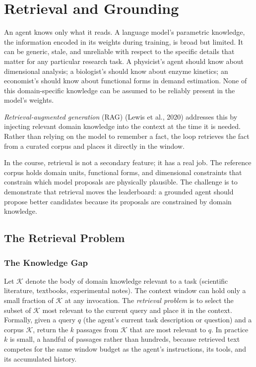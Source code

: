 \chapter{Retrieval and Grounding}
\label{chapter:Retrieval}

An agent knows only what it reads.
A language model's parametric knowledge, the information encoded in its weights during training, is broad but limited.
It can be generic, stale, and unreliable with respect to the specific details that matter for any particular research task.
A physicist's agent should know about dimensional analysis; a biologist's should know about enzyme kinetics; an economist's should know about functional forms in demand estimation.
None of this domain-specific knowledge can be assumed to be reliably present in the model's weights.

\emph{Retrieval-augmented generation} (RAG) (Lewis et al., 2020) addresses this by injecting relevant domain knowledge into the context at the time it is needed.
Rather than relying on the model to remember a fact, the loop retrieves the fact from a curated corpus and places it directly in the window.

In the course, retrieval is not a secondary feature; it has a real job.
The reference corpus holds domain units, functional forms, and dimensional constraints that constrain which model proposals are physically plausible.
The challenge is to demonstrate that retrieval moves the leaderboard: a grounded agent should propose better candidates because its proposals are constrained by domain knowledge.

\section{The Retrieval Problem}
\label{section:RetrievalProblem}

\subsection{The Knowledge Gap}

Let $\mathcal{K}$ denote the body of domain knowledge relevant to a task (scientific literature, textbooks, experimental notes).
The context window can hold only a small fraction of $\mathcal{K}$ at any invocation.
The \emph{retrieval problem} is to select the subset of $\mathcal{K}$ most relevant to the current query and place it in the context.
Formally, given a query $q$ (the agent's current task description or question) and a corpus $\mathcal{K}$, return the $k$ passages from $\mathcal{K}$ that are most relevant to $q$.
In practice $k$ is small, a handful of passages rather than hundreds, because retrieved text competes for the same window budget as the agent's instructions, its tools, and its accumulated history.

